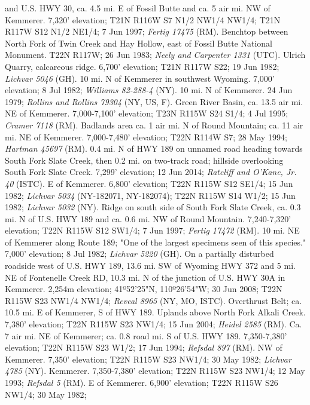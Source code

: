and U.S. HWY 30, ca. 4.5 mi. E of Fossil Butte and ca. 5 air mi. NW of
Kemmerer. 7,320' elevation; T21N R116W S7 N1/2 NW1/4 NW1/4;
T21N R117W S12 N1/2 NE1/4; 7 Jun 1997; \textit{Fertig 17475} (RM).
Benchtop between North Fork of Twin Creek and Hay Hollow, east of Fossil Butte
National Monument. T22N R117W; 26 Jun 1983;
\textit{Neely and Carpenter 1331} (UTC).
Ulrich Quarry, calcareous ridge. 6,700' elevation; T21N R117W S22; 19 Jun 1982;
\textit{Lichvar 5046} (GH).
10 mi. N of Kemmerer in southwest Wyoming. 7,000' elevation; 8 Jul 1982;
\textit{Williams 82-288-4} (NY).
10 mi. N of Kemmerer. 24 Jun 1979;
\textit{Rollins and Rollins 79304} (NY, US, F).
Green River Basin, ca. 13.5 air mi. NE of Kemmerer. 7,000-7,100' elevation;
T23N R115W S24 S1/4; 4 Jul 1995; \textit{Cramer 7118} (RM).
Badlands area ca. 1 air mi. N of Round Mountain; ca. 11 air mi. NE of Kemmerer.
7,000-7,480' elevation; T22N R114W S7; 28 May 1994; \textit{Hartman 45697} (RM).
0.4 mi. N of HWY 189 on unnamed road heading towards South Fork Slate Creek,
then 0.2 mi. on two-track road; hillside overlooking South Fork Slate Creek.
7,299' elevation; 12 Jun 2014; \textit{Ratcliff and O'Kane, Jr. 40} (ISTC).
E of Kemmerer. 6,800' elevation; T22N R115W S12 SE1/4; 15 Jun 1982;
\textit{Lichvar 5034} (NY-182071, NY-182074);
T22N R115W S14 W1/2; 15 Jun 1982; \textit{Lichvar 5032} (NY).
Ridge on south side of South Fork Slate Creek, ca. 0.3 mi. N of U.S. HWY 189
and ca. 0.6 mi. NW of Round Mountain. 7,240-7,320' elevation;
T22N R115W S12 SW1/4; 7 Jun 1997; \textit{Fertig 17472} (RM).
10 mi. NE of Kemmerer along Route 189; "One of the largest specimens seen of
this species." 7,000' elevation; 8 Jul 1982; \textit{Lichvar 5220} (GH).
On a partially disturbed roadside west of U.S. HWY 189, 13.6 mi. SW of Wyoming
HWY 372 and 5 mi. NE of Fontenelle Creek RD, 10.3 mi. N of the junction of
U.S. HWY 30A in Kemmerer. 2,254m elevation;
41º52'25"N, 110º26'54"W; 30 Jun 2008; T22N R115W S23 NW1/4 NW1/4;
\textit{Reveal 8965} (NY, MO, ISTC).
Overthrust Belt; ca. 10.5 mi. E of Kemmerer, S of HWY 189. Uplands above North
Fork Alkali Creek. 7,380' elevation; T22N R115W S23 NW1/4; 15 Jun 2004;
\textit{Heidel 2585} (RM).
Ca. 7 air mi. NE of Kemmerer; ca. 0.8 road mi. S of U.S. HWY 189.
7,350-7,380' elevation; T22N R115W S23 W1/2; 17 Jun 1994;
\textit{Refsdal 897} (RM).
NW of Kemmerer. 7,350' elevation; T22N R115W S23 NW1/4; 30 May 1982;
\textit{Lichvar 4785} (NY).
Kemmerer. 7,350-7,380' elevation; T22N R115W S23 NW1/4; 12 May 1993;
\textit{Refsdal 5} (RM).
E of Kemmerer. 6,900' elevation; T22N R115W S26 NW1/4; 30 May 1982;
